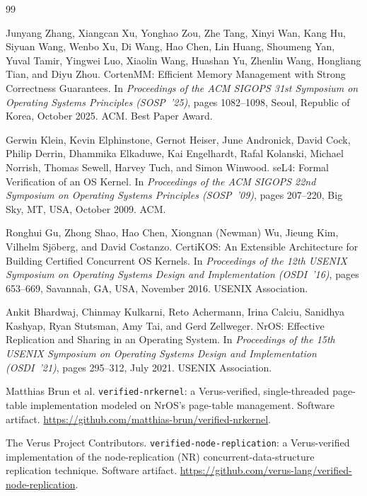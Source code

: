 \documentclass[10pt]{article}
\begin{document}
\begin{thebibliography}{99}

Junyang Zhang, Xiangcan Xu, Yonghao Zou, Zhe Tang, Xinyi Wan, Kang Hu,
Siyuan Wang, Wenbo Xu, Di Wang, Hao Chen, Lin Huang, Shoumeng Yan,
Yuval Tamir, Yingwei Luo, Xiaolin Wang, Huashan Yu, Zhenlin Wang,
Hongliang Tian, and Diyu Zhou.
\newblock CortenMM: Efficient Memory Management with Strong
Correctness Guarantees.
\newblock In \emph{Proceedings of the ACM SIGOPS 31st Symposium on
Operating Systems Principles (SOSP~'25)}, pages 1082--1098, Seoul,
Republic of Korea, October 2025. ACM. Best Paper Award.

Gerwin Klein, Kevin Elphinstone, Gernot Heiser, June Andronick,
David Cock, Philip Derrin, Dhammika Elkaduwe, Kai Engelhardt,
Rafal Kolanski, Michael Norrish, Thomas Sewell, Harvey Tuch, and
Simon Winwood.
\newblock seL4: Formal Verification of an OS Kernel.
\newblock In \emph{Proceedings of the ACM SIGOPS 22nd Symposium on
Operating Systems Principles (SOSP~'09)}, pages 207--220, Big Sky,
MT, USA, October 2009. ACM.

Ronghui Gu, Zhong Shao, Hao Chen, Xiongnan (Newman) Wu, Jieung Kim,
Vilhelm Sj\"oberg, and David Costanzo.
\newblock CertiKOS: An Extensible Architecture for Building Certified
Concurrent OS Kernels.
\newblock In \emph{Proceedings of the 12th USENIX Symposium on
Operating Systems Design and Implementation (OSDI~'16)}, pages
653--669, Savannah, GA, USA, November 2016. USENIX Association.

Ankit Bhardwaj, Chinmay Kulkarni, Reto Achermann, Irina Calciu,
Sanidhya Kashyap, Ryan Stutsman, Amy Tai, and Gerd Zellweger.
\newblock NrOS: Effective Replication and Sharing in an Operating
System.
\newblock In \emph{Proceedings of the 15th USENIX Symposium on
Operating Systems Design and Implementation (OSDI~'21)}, pages
295--312, July 2021. USENIX Association.

Matthias Brun et al.
\newblock \texttt{verified-nrkernel}: a Verus-verified, single-threaded
page-table implementation modeled on NrOS's page-table management.
\newblock Software artifact.
\newblock \url{https://github.com/matthias-brun/verified-nrkernel}.

The Verus Project Contributors.
\newblock \texttt{verified-node-replication}: a Verus-verified
implementation of the node-replication (NR) concurrent-data-structure
replication technique.
\newblock Software artifact.
\newblock \url{https://github.com/verus-lang/verified-node-replication}.


\end{thebibliography}
\end{document}
